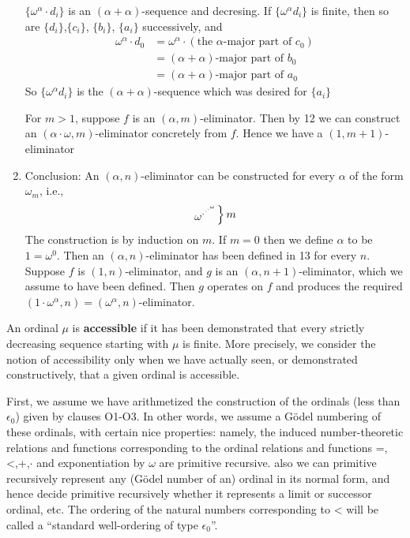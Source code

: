 \documentclass[11pt]{article}
\begin{document}
\begin{enumerate}
\(\{\omega^\alpha\cdot d_i\}\) is an \((\alpha+\alpha)\)-sequence and decresing.
If \(\{\omega^\alpha d_i\}\) is finite, then so are \(\{d_i\}\),\(\{c_i\}\), \(\{b_i\}\), \(\{a_i\}\)
successively, and
   \begin{align*}
\omega^\alpha\cdot d_0&=\omega^\alpha\cdot (\text{the $\alpha$-major part of }c_0)\\
&=(\alpha+\alpha)\text{-major part of }b_0\\
&=(\alpha+\alpha)\text{-major part of }a_0
   \end{align*}
So \(\{\omega^\alpha d_i\}\) is the \((\alpha+\alpha)\)-sequence which was desired for \(\{a_i\}\)

For \(m>1\), suppose \(f\) is an \((\alpha,m)\)-eliminator. Then by 12 we can construct
an \((\alpha\cdot\omega,m)\)-eliminator concretely from \(f\). Hence we have a \((1,m+1)\)-eliminator
\item Conclusion: An \((\alpha,n)\)-eliminator can be constructed for every \(\alpha\) of the form \(\omega_m\),
i.e.,
   \begin{equation*}
\begin{rcases}
\omega^{\cdot^{\cdot^{\cdot^{\omega}}}}
\end{rcases}
m
   \end{equation*}
The construction is by induction on \(m\). If \(m=0\) then we define \(\alpha\) to be \(1=\omega^0\).
Then an \((\alpha,n)\)-eliminator has been defined in 13 for every \(n\). Suppose \(f\)
is \((1,n)\)-eliminator, and \(g\) is an \((\alpha,n+1)\)-eliminator, which we assume to have been
defined. Then \(g\) operates on \(f\) and produces the
required \((1\cdot\omega^\alpha,n)=(\omega^\alpha,n)\)-eliminator.
\end{enumerate}


An ordinal \(\mu\) is \textbf{accessible} if it has been demonstrated that every strictly decreasing sequence
starting with \(\mu\) is finite. More precisely, we consider the notion of accessibility only when we
have actually seen, or demonstrated constructively, that a given ordinal is accessible.

First, we assume we have arithmetized the construction of the ordinals (less than \(\epsilon_0\))
given by clauses O1-O3. In other words, we assume a Gödel numbering of these ordinals, with
certain nice properties: namely, the induced number-theoretic relations and functions
corresponding to the ordinal relations and functions =,<,+,\(\cdot\) and exponentiation by \(\omega\) are
primitive recursive. also we can primitive recursively represent any (Gödel number of an) ordinal
in its normal form, and hence decide primitive recursively whether it represents a limit or
successor ordinal, etc. The ordering of the natural numbers corresponding to < will be called a
``standard well-ordering of type \(\epsilon_0\)''.
\end{document}
